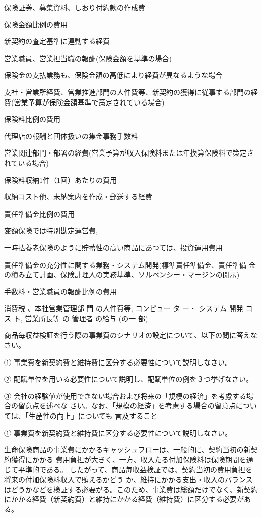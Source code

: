 \documentclass[report,gutter=10mm,fore-edge=10mm,uplatex,dvipdfmx]{jlreq}
\begin{document}
保険証券、募集資料、しおり付約款の作成費


保険金額比例の費用

新契約の査定基準に連動する経費

営業職員、営業担当職の報酬(保険金額を基準の場合)

保険金の支払業務も、保険金額の高低により経費が異なるような場合

支社・営業所経費、営業推進部門の人件費等、新契約の獲得に従事する部門の経費(営業予算が保険金額基準で策定されている場合)


保険料比例の費用

代理店の報酬と団体扱いの集金事務手数料

営業関連部門・部署の経費(営業予算が収入保険料または年換算保険料で策定されている場合)


保険料収納1件（1回）あたりの費用

収納コスト他、未納案内を作成・郵送する経費


責任準備金比例の費用

変額保険では特別勘定運営費,

一時払養老保険のように貯蓄性の高い商品にあつては、投資運用費用

責任準備金の充分性に関する業務・システム開発(標準責任準備金、責任準備
金の積み立て計画、保険計理人の実務基準、ソルベンシー・マージンの開示)


手数料・営業職員の報酬比例の費用

消費税 、本社営業管理部 門 の人件費等, コンピュー タ ー・ システム 開発 コス ト, 
営業所長等 の 管理者 の給与 (の一 部)


商品毎収益検証を行う際の事業費のシナリオの設定について、以下の問に答えなさい。

① 事業費を新契約費と維持費に区分する必要性について説明しなさい。

② 配賦単位を用いる必要性について説明し、配賦単位の例を３つ挙げなさい。

③ 会社の経験値が使用できない場合および将来の「規模の経済」を考慮する場合の留意点を述べな
さい。なお、「規模の経済」を考慮する場合の留意点については、「生産性の向上」についても
言及すること

\answer{}
① 事業費を新契約費と維持費に区分する必要性について説明しなさい。

生命保険商品の事業費にかかるキャッシュフローは、一般的に、契約当初の新契約獲得にかかる
費用負担が大きく、一方、収入たる付加保険料は保険期間を通じて平準的である。
したがって、商品毎収益検証では、契約当初の費用負担を将来の付加保険料収入で賄えるかどう
か、維持にかかる支出・収入のバランスはどうかなどを検証する必要がる。このため、事業費は総額だけでなく、新契約にかかる経費（新契約費）と維持にかかる経費（維持費）に区分する必要がある。
\end{document}
